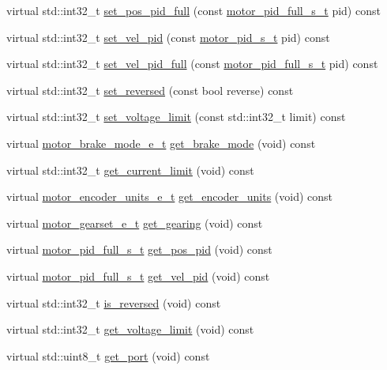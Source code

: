 \begin{DoxyCompactItemize}
\item 
virtual std\+::int32\+\_\+t \hyperlink{classpros_1_1Motor_a67cff0666b34c3731e21e856414c2066}{set\+\_\+pos\+\_\+pid\+\_\+full} (const \hyperlink{motors_8h_a0295cbf49f5c70c17b5fa962bd25febd}{motor\+\_\+pid\+\_\+full\+\_\+s\+\_\+t} pid) const
\item 
virtual std\+::int32\+\_\+t \hyperlink{classpros_1_1Motor_a69169ae0cd2b7f68ee533648c7830397}{set\+\_\+vel\+\_\+pid} (const \hyperlink{motors_8h_ad2e907c8d7ce53c1fd91f1b9801072e3}{motor\+\_\+pid\+\_\+s\+\_\+t} pid) const
\item 
virtual std\+::int32\+\_\+t \hyperlink{classpros_1_1Motor_a7fc8eefc04c8b8aaefad75437b49f30a}{set\+\_\+vel\+\_\+pid\+\_\+full} (const \hyperlink{motors_8h_a0295cbf49f5c70c17b5fa962bd25febd}{motor\+\_\+pid\+\_\+full\+\_\+s\+\_\+t} pid) const
\item 
virtual std\+::int32\+\_\+t \hyperlink{classpros_1_1Motor_a44fcc6447ed1416e880232baa16a221e}{set\+\_\+reversed} (const bool reverse) const
\item 
virtual std\+::int32\+\_\+t \hyperlink{classpros_1_1Motor_a3cd7e4ca0714b533d873796cf8b74a81}{set\+\_\+voltage\+\_\+limit} (const std\+::int32\+\_\+t limit) const
\item 
virtual \hyperlink{motors_8h_aa324a2881696428c9e3684f9ad23a83b}{motor\+\_\+brake\+\_\+mode\+\_\+e\+\_\+t} \hyperlink{classpros_1_1Motor_acc0c2225d2b713b73e1caee1a483a958}{get\+\_\+brake\+\_\+mode} (void) const
\item 
virtual std\+::int32\+\_\+t \hyperlink{classpros_1_1Motor_ad2eafcdf16ed480ddcbb80a45b19c01a}{get\+\_\+current\+\_\+limit} (void) const
\item 
virtual \hyperlink{motors_8h_a6677ba23760c558fd8b7b4e1e00a6123}{motor\+\_\+encoder\+\_\+units\+\_\+e\+\_\+t} \hyperlink{classpros_1_1Motor_a9fd37f3efa2f903bda8bf575b0052fd2}{get\+\_\+encoder\+\_\+units} (void) const
\item 
virtual \hyperlink{motors_8h_aa2f1c305c998abc3bf8dd1f76fa4da8b}{motor\+\_\+gearset\+\_\+e\+\_\+t} \hyperlink{classpros_1_1Motor_a3227bc4fbe531638472fff4dfb134333}{get\+\_\+gearing} (void) const
\item 
virtual \hyperlink{motors_8h_a0295cbf49f5c70c17b5fa962bd25febd}{motor\+\_\+pid\+\_\+full\+\_\+s\+\_\+t} \hyperlink{classpros_1_1Motor_a32193b8d020ad1b47e1cb9f0b74a6c7d}{get\+\_\+pos\+\_\+pid} (void) const
\item 
virtual \hyperlink{motors_8h_a0295cbf49f5c70c17b5fa962bd25febd}{motor\+\_\+pid\+\_\+full\+\_\+s\+\_\+t} \hyperlink{classpros_1_1Motor_a2b939563c3b915d7b8ce3dd1dece6208}{get\+\_\+vel\+\_\+pid} (void) const
\item 
virtual std\+::int32\+\_\+t \hyperlink{classpros_1_1Motor_a5122faa60ef7745761eca847192560c5}{is\+\_\+reversed} (void) const
\item 
virtual std\+::int32\+\_\+t \hyperlink{classpros_1_1Motor_a2afbe15bed764ca6d21f1e7c6c8da700}{get\+\_\+voltage\+\_\+limit} (void) const
\item 
virtual std\+::uint8\+\_\+t \hyperlink{classpros_1_1Motor_a5b0e644c8af396a6af8142b41d1bc7b6}{get\+\_\+port} (void) const
\end{DoxyCompactItemize}
